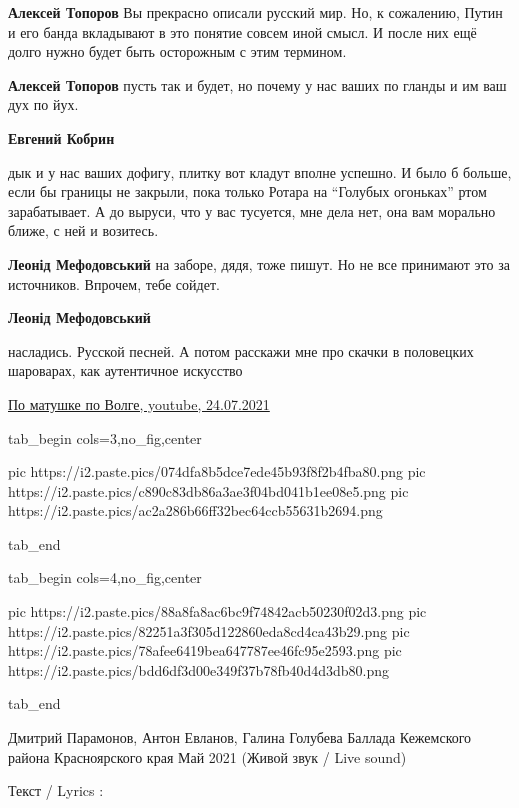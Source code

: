 \begin{itemize}
\begin{itemize}
\textbf{Алексей Топоров} Вы прекрасно описали русский мир.
Но, к сожалению, Путин и его банда вкладывают в это понятие совсем иной смысл. И после них ещё долго нужно будет быть осторожным с этим термином.

\textbf{Алексей Топоров} пусть так и будет, но почему у нас ваших по гланды и им ваш дух по йух.

\textbf{Евгений Кобрин} 

дык и у нас ваших дофигу, плитку вот кладут вполне успешно. И было б больше,
если бы границы не закрыли, пока только Ротара на \enquote{Голубых огоньках} ртом
зарабатывает. А до выруси, что у вас тусуется, мне дела нет, она вам морально
ближе, с ней и возитесь.

\textbf{Леонід Мефодовський} на заборе, дядя, тоже пишут. Но не все принимают это за источников. Впрочем, тебе сойдет.

\textbf{Леонід Мефодовський} 

насладись. Русской песней. А потом расскажи мне про скачки в половецких
шароварах, как аутентичное искусство

\href{https://www.youtube.com/watch?v=6G1oo6FyHcA}{%
По матушке по Волге, youtube, 24.07.2021%
}


\ifcmt
  tab_begin cols=3,no_fig,center

     pic https://i2.paste.pics/074dfa8b5dce7ede45b93f8f2b4fba80.png
		 pic https://i2.paste.pics/c890c83db86a3ae3f04bd041b1ee08e5.png
		 pic https://i2.paste.pics/ac2a286b66ff32bec64ccb55631b2694.png

  tab_end

  tab_begin cols=4,no_fig,center

		 pic https://i2.paste.pics/88a8fa8ac6bc9f74842acb50230f02d3.png
		 pic https://i2.paste.pics/82251a3f305d122860eda8cd4ca43b29.png
		 pic https://i2.paste.pics/78afee6419bea647787ee46fc95e2593.png
		 pic https://i2.paste.pics/bdd6df3d00e349f37b78fb40d4d3db80.png

  tab_end
\fi

\begin{multicols}{2} %
Дмитрий Парамонов, Антон Евланов, Галина Голубева
Баллада Кежемского района Красноярского края
Май 2021
(Живой звук / Live sound)

Текст / Lyrics :


\end{multicols}
\end{itemize}
\end{itemize}
